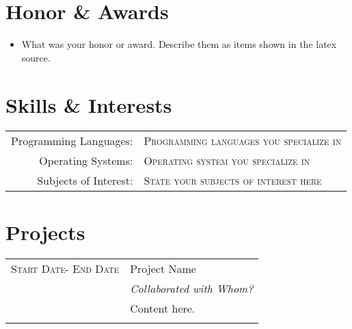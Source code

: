 \documentclass[a4paper,10pt]{article}
\begin{document}
%

\section{Honor \& Awards}

\begin{itemize}

\item What was your honor or award. Describe them as items shown in the latex source.
\end{itemize}

\section{Skills \& Interests}
\begin{tabular}{rl}
 Programming Languages:& \textsc{Programming languages you specialize in}
\setmainfont[SmallCapsFont=Fontin-SmallCaps.otf]{Fontin.otf}\\
Operating Systems:& \textsc{Operating system you specialize in}\\
Subjects of Interest:& \textsc{State your subjects of interest here}
\end{tabular}


\section{Projects}
\begin{tabular}[h]{r|p{11cm}}
 \textsc{Start Date- End Date} & Project Name \\&
\emph{Collaborated with Whom?} 
 \\&\footnotesize{Content here.}\\\multicolumn{2}{c}{} \\
 
\end{tabular}
\end{document}
